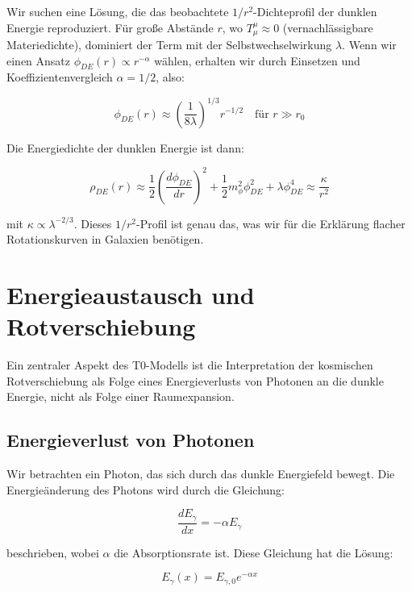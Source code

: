 \documentclass[a4paper,12pt]{article}
\begin{document}
Wir suchen eine Lösung, die das beobachtete $1/r^2$-Dichteprofil der dunklen Energie reproduziert. Für große Abstände $r$, wo $T^{\mu}_{\mu} \approx 0$ (vernachlässigbare Materiedichte), dominiert der Term mit der Selbstwechselwirkung $\lambda$. Wenn wir einen Ansatz $\phi_{DE}(r) \propto r^{-\alpha}$ wählen, erhalten wir durch Einsetzen und Koeffizientenvergleich $\alpha = 1/2$, also:

\begin{equation}
	\phi_{DE}(r) \approx \left(\frac{1}{8\lambda}\right)^{1/3} r^{-1/2} \quad \text{für } r \gg r_0
\end{equation}

Die Energiedichte der dunklen Energie ist dann:

\begin{equation}
	\rho_{DE}(r) \approx \frac{1}{2}\left(\frac{d\phi_{DE}}{dr}\right)^2 + \frac{1}{2}m_{\phi}^2\phi_{DE}^2 + \lambda\phi_{DE}^4 \approx \frac{\kappa}{r^2}
\end{equation}

mit $\kappa \propto \lambda^{-2/3}$. Dieses $1/r^2$-Profil ist genau das, was wir für die Erklärung flacher Rotationskurven in Galaxien benötigen.

\section{Energieaustausch und Rotverschiebung}

Ein zentraler Aspekt des T0-Modells ist die Interpretation der kosmischen Rotverschiebung als Folge eines Energieverlusts von Photonen an die dunkle Energie, nicht als Folge einer Raumexpansion.

\subsection{Energieverlust von Photonen}

Wir betrachten ein Photon, das sich durch das dunkle Energiefeld bewegt. Die Energieänderung des Photons wird durch die Gleichung:

\begin{equation}
	\frac{dE_{\gamma}}{dx} = -\alpha E_{\gamma}
\end{equation}

beschrieben, wobei $\alpha$ die Absorptionsrate ist. Diese Gleichung hat die Lösung:

\begin{equation}
	E_{\gamma}(x) = E_{\gamma,0} e^{-\alpha x}
\end{equation}
\end{document}
